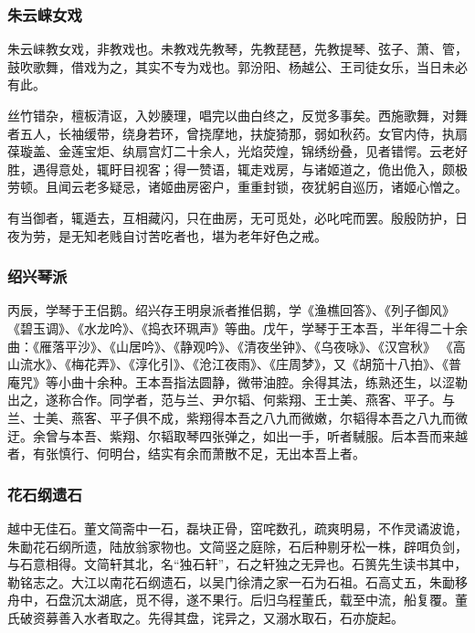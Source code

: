 \documentclass[]{article}
\begin{document}
\hypertarget{header-n123}{%
\subsubsection{朱云崃女戏}\label{header-n123}}

朱云崃教女戏，非教戏也。未教戏先教琴，先教琵琶，先教提琴、弦子、萧、管，鼓吹歌舞，借戏为之，其实不专为戏也。郭汾阳、杨越公、王司徒女乐，当日未必有此。

丝竹错杂，檀板清讴，入妙腠理，唱完以曲白终之，反觉多事矣。西施歌舞，对舞者五人，长袖缓带，绕身若环，曾挠摩地，扶旋猗那，弱如秋药。女官内侍，执扇葆璇盖、金莲宝炬、纨扇宫灯二十余人，光焰荧煌，锦绣纷叠，见者错愕。云老好胜，遇得意处，辄盱目视客；得一赞语，辄走戏房，与诸姬道之，佹出佹入，颇极劳顿。且闻云老多疑忌，诸姬曲房密户，重重封锁，夜犹躬自巡历，诸姬心憎之。

有当御者，辄遁去，互相藏闪，只在曲房，无可觅处，必叱咤而罢。殷殷防护，日夜为劳，是无知老贱自讨苦吃者也，堪为老年好色之戒。

\hypertarget{header-n130}{%
\subsubsection{绍兴琴派}\label{header-n130}}

丙辰，学琴于王侣鹅。绍兴存王明泉派者推侣鹅，学《渔樵回答》、《列子御风》
《碧玉调》、《水龙吟》、《捣衣环珮声》等曲。戊午，学琴于王本吾，半年得二十余曲：《雁落平沙》、《山居吟》、《静观吟》、《清夜坐钟》、《乌夜咏》、《汉宫秋》
《高山流水》、《梅花弄》、《淳化引》、《沧江夜雨》、《庄周梦》，又《胡笳十八拍》、《普庵咒》等小曲十余种。王本吾指法圆静，微带油腔。余得其法，练熟还生，以涩勒出之，遂称合作。同学者，范与兰、尹尔韬、何紫翔、王士美、燕客、平子。与兰、士美、燕客、平子俱不成，紫翔得本吾之八九而微嫩，尔韬得本吾之八九而微迂。余曾与本吾、紫翔、尔韬取琴四张弹之，如出一手，听者駴服。后本吾而来越者，有张慎行、何明台，结实有余而萧散不足，无出本吾上者。

\hypertarget{header-n135}{%
\subsubsection{花石纲遗石}\label{header-n135}}

越中无佳石。董文简斋中一石，磊块正骨，窋咤数孔，疏爽明易，不作灵谲波诡，朱勔花石纲所遗，陆放翁家物也。文简竖之庭除，石后种剔牙松一株，辟咡负剑，与石意相得。文简轩其北，名``独石轩''，石之轩独之无异也。石篑先生读书其中，勒铭志之。大江以南花石纲遗石，以吴门徐清之家一石为石祖。石高丈五，朱勔移舟中，石盘沉太湖底，觅不得，遂不果行。后归乌程董氏，载至中流，船复覆。董氏破资募善入水者取之。先得其盘，诧异之，又溺水取石，石亦旋起。
\end{document}
